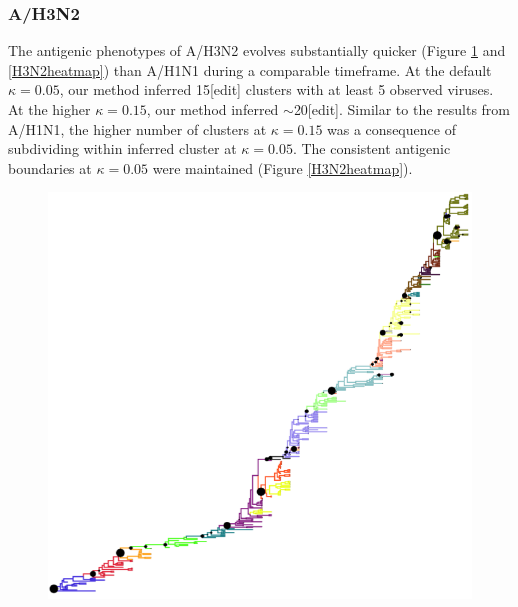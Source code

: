 \documentclass[11pt,oneside,letterpaper]{article}
\begin{document}
\subsubsection*{A/H3N2}
The antigenic phenotypes of A/H3N2 evolves substantially quicker (Figure \ref{H3N2tree} and \ref{H3N2heatmap}) than A/H1N1 during a comparable timeframe.  %
At the default $\kappa=0.05$, our method inferred 15[edit] clusters with at least 5 observed viruses.  
At the higher $\kappa=0.15$, our method inferred $\sim$20[edit]. 
Similar to the results from A/H1N1, the higher number of clusters at $\kappa=0.15$ was a consequence of subdividing within inferred cluster at $\kappa=0.05$. 
The consistent antigenic boundaries at $\kappa=0.05$ were maintained (Figure \ref{H3N2heatmap}). 


\begin{figure}[h]
	\centering		
	\includegraphics[width=1\textwidth]{figures/custom/H3N2MCC}
	\caption{\textbf{}
	 		} 
	\label{H3N2tree} 
\end{figure}
\end{document}
